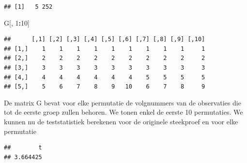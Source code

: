 \documentclass[
  12pt,dutch]{book}
\newenvironment{Shaded}{\begin{snugshade}}{\end{snugshade}}
\newcommand{\AttributeTok}[1]{\textcolor[rgb]{0.13,0.29,0.53}{#1}}
\newcommand{\CommentTok}[1]{\textcolor[rgb]{0.56,0.35,0.01}{\textit{#1}}}
\newcommand{\ControlFlowTok}[1]{\textcolor[rgb]{0.13,0.29,0.53}{\textbf{#1}}}
\newcommand{\DecValTok}[1]{\textcolor[rgb]{0.00,0.00,0.81}{#1}}
\newcommand{\FunctionTok}[1]{\textcolor[rgb]{0.13,0.29,0.53}{\textbf{#1}}}
\newcommand{\NormalTok}[1]{#1}
\newcommand{\OtherTok}[1]{\textcolor[rgb]{0.56,0.35,0.01}{#1}}
\newcommand{\SpecialCharTok}[1]{\textcolor[rgb]{0.81,0.36,0.00}{\textbf{#1}}}
\theoremstyle{definition}
\theoremstyle{definition}
\theoremstyle{definition}
\theoremstyle{definition}
\theoremstyle{remark}
\begin{document}
\begin{verbatim}
## [1]   5 252
\end{verbatim}

\begin{Shaded}
\begin{Highlighting}[]
\NormalTok{G[, }\DecValTok{1}\SpecialCharTok{:}\DecValTok{10}\NormalTok{]}
\end{Highlighting}
\end{Shaded}

\begin{verbatim}
##      [,1] [,2] [,3] [,4] [,5] [,6] [,7] [,8] [,9] [,10]
## [1,]    1    1    1    1    1    1    1    1    1     1
## [2,]    2    2    2    2    2    2    2    2    2     2
## [3,]    3    3    3    3    3    3    3    3    3     3
## [4,]    4    4    4    4    4    4    5    5    5     5
## [5,]    5    6    7    8    9   10    6    7    8     9
\end{verbatim}

De matrix G bevat voor elke permutatie de volgnummers van de observaties die tot de eerste groep zullen behoren.
We tonen enkel de eerste 10 permutaties.
We kunnen nu de teststatistiek berekenen voor de originele steekproef en voor elke permutatie

\begin{Shaded}
\end{Shaded}

\begin{verbatim}
##        t 
## 3.664425
\end{verbatim}

\begin{Shaded}
\end{Shaded}
\end{document}

